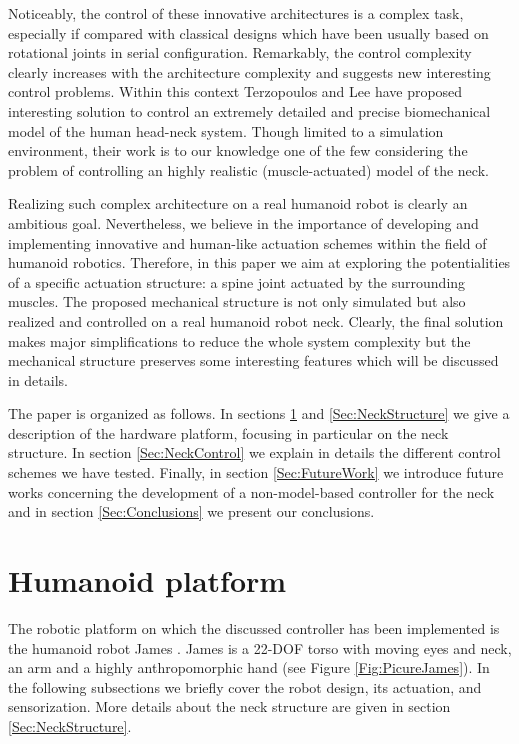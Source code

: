 \documentclass[conference]{IEEEtran}
\numberwithin{equation}{section}
\begin{document}
Noticeably, the control of these innovative architectures is a complex task, especially if compared with classical designs \cite{Kim04head,Billard05robota} which have been usually based on rotational joints in serial configuration. Remarkably, the control complexity clearly increases with the architecture complexity and suggests new interesting control problems. Within this context Terzopoulos and Lee \cite{Terzopoulos06} have proposed interesting solution to control an extremely detailed and precise biomechanical model of the human head-neck system. Though limited to a simulation environment, their work is to our knowledge one of the few considering the problem of controlling an highly realistic (muscle-actuated) model of the neck.

Realizing such complex architecture on a real humanoid robot is clearly an ambitious goal. Nevertheless, we believe in the importance of developing and implementing innovative and human-like actuation schemes within the field of humanoid robotics. Therefore, in this paper we aim at exploring the potentialities of a specific actuation structure: a spine joint actuated by the surrounding muscles. The proposed mechanical structure is not only simulated but also realized and controlled on a real humanoid robot neck. Clearly, the final solution makes major simplifications to reduce the whole system complexity but the mechanical structure preserves some interesting features which will be discussed in details. 

The paper is organized as follows. In sections \ref{Sec:Platform} and \ref{Sec:NeckStructure} we give a description of the hardware platform, focusing in particular on the neck structure. In section \ref{Sec:NeckControl} we explain in details the different control schemes we have tested. Finally, in section \ref{Sec:FutureWork} we introduce future works concerning the development of a non-model-based controller for the neck and in section \ref{Sec:Conclusions} we present our conclusions.


\section{Humanoid platform} \label{Sec:Platform}

The robotic platform on which the discussed controller has been implemented is the humanoid robot James \cite{James06}. James is a 22-DOF torso with moving eyes and neck, an arm and a highly anthropomorphic hand (see Figure \ref{Fig:PicureJames}). In the following subsections we briefly cover the robot design, its actuation, and sensorization. More details about the neck structure are given in section \ref{Sec:NeckStructure}.
\end{document}
